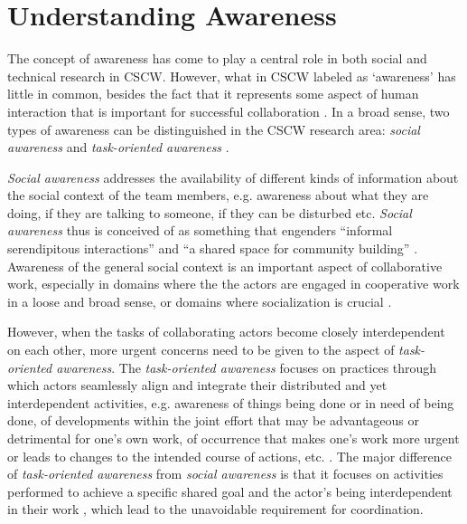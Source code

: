 \graphicspath{{Figures/}}
\chapter{Understanding Awareness} %
\label{cha:understanding_awareness}


The concept of awareness has come to play a central role in both social and technical research in CSCW. However, what in CSCW labeled as `awareness' has little in common, besides the fact that it represents some aspect of human interaction that is important for successful collaboration \cite{schmidt2002a}. In a broad sense, two types of awareness can be distinguished in the CSCW research area: \emph{social awareness} and \emph{task-oriented awareness} \cite{prinz1999a,schmidt2002a}.

\emph{Social awareness} addresses the availability of different kinds of information about the social context of the team members, e.g. awareness about what they are doing, if they are talking to someone, if they can be disturbed etc. \emph{Social awareness} thus is conceived of as something that engenders ``informal serendipitous interactions'' \cite{hudson1996a} and ``a shared space for community building'' \cite{Dourish1992}. Awareness of the general social context is an important aspect of collaborative work, especially in domains where the the actors are engaged in cooperative work in a loose and broad sense, or domains where socialization is crucial \cite{schmidt2002a}.

However, when the tasks of collaborating actors become closely interdependent on each other, more urgent concerns need to be given to the aspect of \emph{task-oriented awareness}. The \emph{task-oriented awareness} focuses on practices through which actors seamlessly align and integrate their distributed and yet interdependent activities, e.g. awareness of things being done or in need of being done, of developments within the joint effort that may be advantageous or detrimental for one’s own work, of occurrence that makes one’s work more urgent or leads to changes to the intended course of actions, etc. \cite{schmidt2002a}. The major difference of \emph{task-oriented awareness} from \emph{social awareness} is that it focuses on activities performed to achieve a specific shared goal \cite{carroll2003a} and the actor’s being interdependent in their work \cite{schmidt2002a}, which lead to the unavoidable requirement for coordination.

